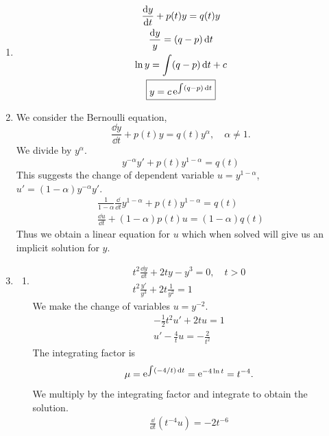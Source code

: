{%
\begin{Solution}
  \label{solution dydt+py=qy}
  \begin{enumerate}
  \item
    \begin{gather*}
      \frac{\mathrm{d} y}{\mathrm{d} t} + p(t) y = q(t) y \\
      \frac{\mathrm{d} y}{ y } = (q - p) \,\mathrm{d} t \\
      \ln y = \int(q - p) \,\mathrm{d} t + c \\
      \boxed{
        y = c \mathop{\mathrm{e}}\nolimits^{\int (q - p) \,\mathrm{d} t}
        }
    \end{gather*}
  \item
    We consider the Bernoulli equation,
    \[
    \frac{\dd y}{\dd t} + p(t) y = q(t) y^\alpha, \quad \alpha \neq 1.
    \]
    We divide by $y^\alpha$.
    \[ 
    y^{-\alpha} y' + p(t) y^{1-\alpha} = q(t) 
    \]
    This suggests the change of dependent variable $u = y^{1-\alpha}$,
    $u' = (1-\alpha)y^{-\alpha} y'$.
    \begin{gather*}
      \frac{1}{1-\alpha} \frac{\dd}{\dd t} y^{1-\alpha} + p(t) y^{1-\alpha} = q(t) \\
      \frac{\dd u}{\dd t} + (1-\alpha) p(t) u = (1 - \alpha) q(t)
    \end{gather*}
    Thus we obtain a linear equation for $u$ which when solved will give us an
    implicit solution for $y$.
  \item
    \begin{enumerate}
    \item
      \begin{gather*}
        t^2 \frac{\dd y}{\dd t} + 2 t y - y^3 = 0, \quad t > 0 \\
        t^2 \frac{ y' }{ y^3 } + 2 t \frac{ 1 }{ y^2 } = 1
      \end{gather*}
      We make the change of variables $u = y^{-2}$.
      \begin{gather*}
        - \frac{1}{2} t^2 u' + 2 t u = 1 \\
        u' - \frac{4}{t} u = - \frac{2}{t^2}
      \end{gather*}
      The integrating factor is
      \[
      \mu = \mathop{\mathrm{e}}\nolimits^{\int (-4/t)\,\mathrm{d} t} = \mathop{\mathrm{e}}\nolimits^{-4 \ln t} = t^{-4}.
      \]
      We multiply by the integrating factor and integrate to obtain the solution.
      \begin{gather*}
        \frac{\dd}{\dd t} \left( t^{-4} u \right) = -2 t^{-6} \\

\end{gather*}
\end{enumerate}
\end{enumerate}
\end{Solution}}
